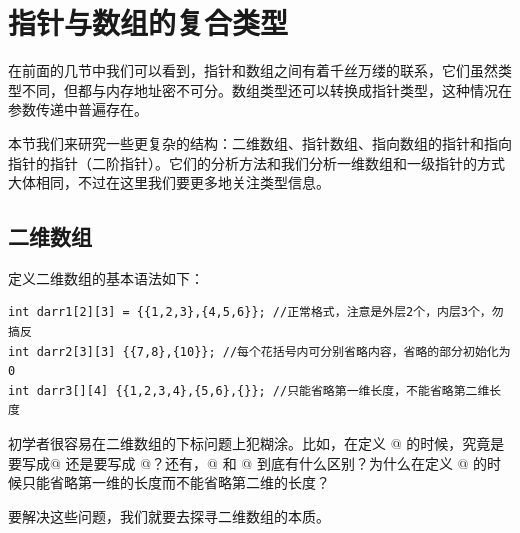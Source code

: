 \section{指针与数组的复合类型}
在前面的几节中我们可以看到，指针和数组之间有着千丝万缕的联系，它们虽然类型不同，但都与内存地址密不可分。数组类型还可以转换成指针类型，这种情况在参数传递中普遍存在。\par
本节我们来研究一些更复杂的结构：二维数组、指针数组、指向数组的指针和指向指针的指针（二阶指针）。它们的分析方法和我们分析一维数组和一级指针的方式大体相同，不过在这里我们要更多地关注类型信息。\par
\subsection*{二维数组}
定义二维数组的基本语法如下：
\begin{lstlisting}
int darr1[2][3] = {{1,2,3},{4,5,6}}; //正常格式，注意是外层2个，内层3个，勿搞反
int darr2[3][3] {{7,8},{10}}; //每个花括号内可分别省略内容，省略的部分初始化为0
int darr3[][4] {{1,2,3,4},{5,6},{}}; //只能省略第一维长度，不能省略第二维长度
\end{lstlisting}
初学者很容易在二维数组的下标问题上犯糊涂。比如，在定义 @ 的时候，究竟是要写成\linebreak{}@ 还是要写成 @？还有，\lstinline@int[2][3]@ 和 \lstinline@int[3][2]@ 到底有什么区别？为什么在定义 @ 的时候只能省略第一维的长度而不能省略第二维的长度？\par
要解决这些问题，我们就要去探寻二维数组的本质。\par
